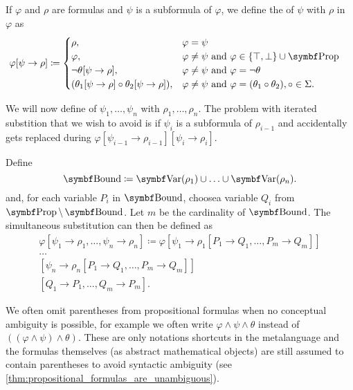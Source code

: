 \begin{definition}\label{def:propositional_substition}
  If \( \varphi \) and \( \rho \) are formulas and \( \psi \) is a subformula of \( \varphi \), we define the  of \( \psi \) with \( \rho \) in \( \varphi \) as
  \begin{align*}
    \varphi[\psi \to \rho] &\coloneqq \begin{cases}
      \rho,                                                    &\varphi = \psi \\
      \varphi,                                                 &\varphi \neq \psi \text{ and } \varphi \in \{ \top, \bot \} \cup \Cat{Prop} \\
      \neg \theta[\psi \to \rho],                              &\varphi \neq \psi \text{ and } \varphi = \neg \theta \\
      (\theta_1[\psi \to \rho] \circ \theta_2[\psi \to \rho]), &\varphi \neq \psi \text{ and } \varphi = (\theta_1 \circ \theta_2), \circ \in \Sigma.
    \end{cases}
  \end{align*}

  We will now define  of \( \psi_1, \ldots, \psi_n \) with \( \rho_1, \ldots, \rho_n \). The problem with iterated substition that we wish to avoid is if \( \psi_i \) is a subformula of \( \rho_{i-1} \) and accidentally gets replaced during \( \varphi[\psi_{i-1} \to \rho_{i-1}][\psi_i \to \rho_i] \).

  Define
  \begin{equation*}
    \Cat{Bound} \coloneqq \Bold{Var}(\rho_1) \cup \ldots \cup \Bold{Var}(\rho_n).
  \end{equation*}
  and, for each variable \( P_i \) in \( \Cat{Bound} \), choose\AOC a variable \( Q_i \) from \( \Bold{Prop} \setminus \Bold{Bound} \). Let \( m \) be the cardinality of \( \Bold{Bound} \). The simultaneous substitution can then be defined as
  \begin{align*}
    \varphi[\psi_1 \to \rho_1, \ldots, \psi_n \to \rho_n] \coloneqq \varphi
    [\psi_1 \to \rho_1[P_1 \to Q_1, \ldots, P_m \to Q_m]] \\
    \ldots \\
    [\psi_n \to \rho_n[P_1 \to Q_1, \ldots, P_m \to Q_m]] \\
    [Q_1 \to P_1, \ldots, Q_m \to P_m].
  \end{align*}
\end{definition}

\begin{remark}\label{remark:propositional_formula_parentheses}
  We often omit parentheses from propositional formulas when no conceptual ambiguity is possible, for example we often write \( \varphi \land \psi \land \theta \) instead of \( ((\varphi \land \psi) \land \theta) \). These are only notations shortcuts in the metalanguage and the formulas themselves (as abstract mathematical objects) are still assumed to contain parentheses to avoid syntactic ambiguity (see \cref{thm:propositional_formulas_are_unambiguous}).
\end{remark}

